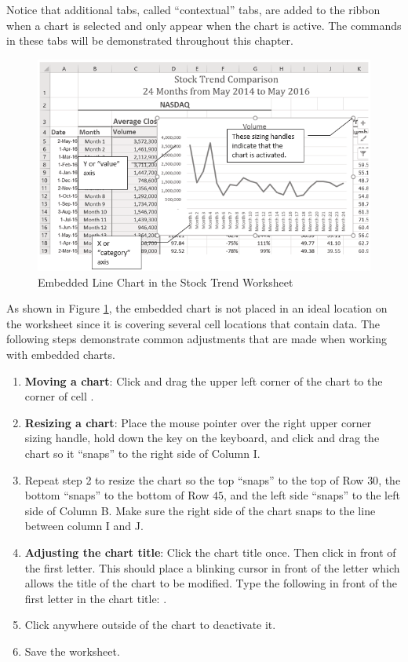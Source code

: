 Notice that additional tabs, called ``contextual'' tabs, are added to the ribbon when a chart is selected and only appear when the chart is active. The commands in these tabs will be demonstrated throughout this chapter.

\begin{figure}[H]
	\centering
	\includegraphics[width=\maxwidth{.95\linewidth}]{gfx/ch04_fig03}
	\caption{Embedded Line Chart in the Stock Trend Worksheet}
	\label{04:fig03}
\end{figure}

As shown in Figure \ref{04:fig03}, the embedded chart is not placed in an ideal location on the worksheet since it is covering several cell locations that contain data. The following steps demonstrate common adjustments that are made when working with embedded charts.

\begin{enumerate}
	\item \textbf{Moving a chart}: Click and drag the upper left corner of the chart to the corner of cell .
	\item \textbf{Resizing a chart}: Place the mouse pointer over the right upper corner sizing handle, hold down the  key on the keyboard, and click and drag the chart so it ``snaps'' to the right side of Column I.
	\item Repeat step 2 to resize the chart so the top ``snaps'' to the top of Row $ 30 $, the bottom ``snaps'' to the bottom of Row $ 45 $, and the left side ``snaps'' to the left side of Column B. Make sure the right side of the chart snaps to the line between column I and J.
	\item \textbf{Adjusting the chart title}: Click the chart title once. Then click in front of the first letter. This should place a blinking cursor in front of the letter which allows the title of the chart to be modified. Type the following in front of the first letter in the chart title: .
	\item Click anywhere outside of the chart to deactivate it.
	\item Save the worksheet.
\end{enumerate}

